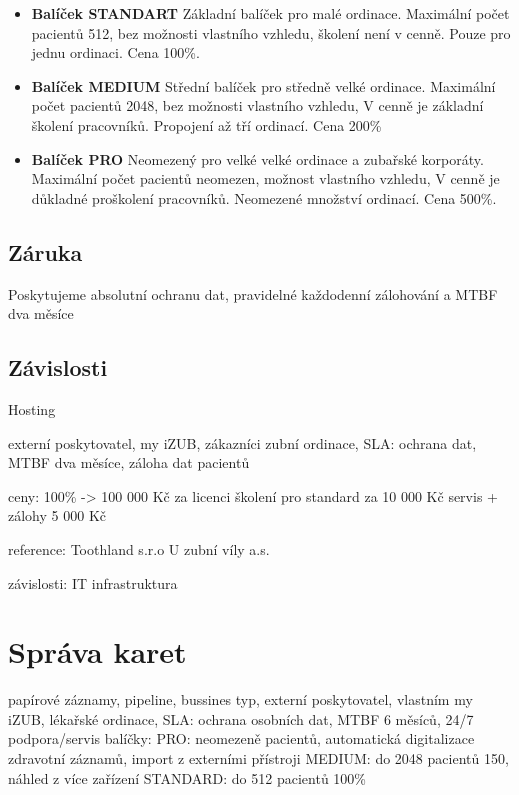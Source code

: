 \documentclass[12pt, a4paper, titlepage]{article}
\begin{document}
	\newpage

	\noindent\makebox[\linewidth]{\rule{16cm}{0.4pt}}

	\begin{itemize}

		

		\item \textbf{Balíček STANDART} Základní balíček pro malé ordinace. Maximální počet pacientů 512, bez možnosti vlastního vzhledu, školení není v cenně. Pouze pro jednu ordinaci. Cena 100\%.

		\item \textbf{Balíček MEDIUM} Střední balíček pro středně velké ordinace. Maximální počet pacientů 2048, bez možnosti vlastního vzhledu, V cenně je základní školení pracovníků. Propojení až tří ordinací. Cena 200\%

		\item \textbf{Balíček PRO} Neomezený pro velké velké ordinace a zubařské korporáty. Maximální počet pacientů neomezen, možnost vlastního vzhledu, V cenně je důkladné proškolení pracovníků. Neomezené množství ordinací. Cena 500\%.
	\end{itemize}

	\subsection*{Záruka}

	Poskytujeme absolutní ochranu dat, pravidelné každodenní zálohování a MTBF dva měsíce

	\subsection*{Závislosti}

	Hosting

	externí poskytovatel,
	my iZUB, zákazníci zubní ordinace, 
	SLA:
		ochrana dat, MTBF dva měsíce, záloha dat pacientů

	ceny:
		100\% -> 100 000 Kč za licenci
		školení pro standard za 10 000 Kč
		servis + zálohy 5 000 Kč

	reference:
		Toothland s.r.o
		U zubní víly a.s.

	závislosti:
		IT infrastruktura


	\section{Správa karet}
	papírové záznamy, pipeline, bussines typ, externí poskytovatel, vlastním my iZUB, lékařské ordinace,
	SLA:
		ochrana osobních dat, MTBF 6 měsíců, 24/7 podpora/servis
	balíčky:
		PRO: neomezeně pacientů, automatická digitalizace zdravotní záznamů, import z externími přístroji 
		MEDIUM: do 2048 pacientů 150, náhled z více zařízení
		STANDARD: do 512 pacientů 100\%
\end{document}
